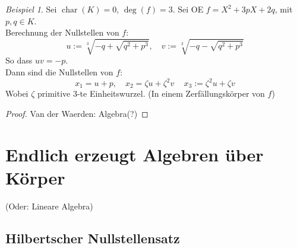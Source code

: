 \documentclass[10pt,a4paper]{article}
\newcommand{\cha}{\ensuremath{\operatorname{char}}}
\newcounter{thm}[section]
\theoremstyle{definition}
\theoremstyle{plain}
\theoremstyle{remark}
\newtheorem{exm}[thm]{Beispiel}
\begin{document}
\begin{exm}
	Sei $\cha(K)=0$, $\deg(f)=3$. Sei OE $f=X^2+3pX+2q$, mit $p,q\in K$.\\
	Berechnung der Nullstellen von $f$:
	\[u:=\sqrt[3]{-q+\sqrt{q^2+p^3}},\quad v:=\sqrt[3]{-q-\sqrt{q^2+p^3}}\]
	So dass $uv=-p$.\\
	Dann sind die Nullstellen von $f$:
	\[x_1=u+p,\quad x_2=\zeta u+\zeta^2 v\,\quad x_3:=\zeta^2u+\zeta v\]
	Wobei $\zeta$ primitive $3$-te Einheitswurzel.
	(In einem Zerfällungskörper von $f$)
\end{exm}
\begin{proof}
	Van der Waerden: Algebra(?)
\end{proof}






\section{Endlich erzeugt Algebren über Körper}
(Oder: Lineare Algebra)


\subsection{Hilbertscher Nullstellensatz}
\end{document}
